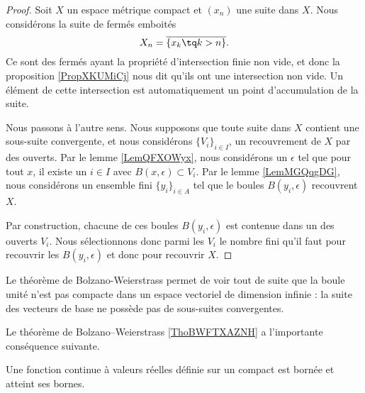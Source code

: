 \begin{proof}
   Soit \( X\) un espace métrique compact et \( (x_n)\) une suite dans \( X\). Nous considérons la suite de fermés emboités
   \begin{equation}
       X_n=\overline{ \{ x_k\tq k>n \} }.
   \end{equation}
   Ce sont des fermés ayant la propriété d'intersection finie non vide, et donc la proposition \ref{PropXKUMiCj} nous dit qu'ils ont une intersection non vide. Un élément de cette intersection est automatiquement un point d'accumulation de la suite.

   Nous passons à l'autre sens. Nous supposons que toute suite dans \( X\) contient une sous-suite convergente, et nous considérons \( \{ V_i \}_{i\in I}\), un recouvrement de \( X\) par des ouverts. Par le lemme \ref{LemQFXOWyx}, nous considérons un \( \epsilon\) tel que pour tout \( x\), il existe un \( i\in I\) avec \( B(x,\epsilon)\subset V_i\). Par le lemme \ref{LemMGQqgDG}, nous considérons un ensemble fini \( \{ y_i \}_{i\in A}\) tel que le boules \( B(y_i,\epsilon)\) recouvrent \( X\).

   Par construction, chacune de ces boules \( B(y_i,\epsilon)\) est contenue dans un des ouverts \( V_i\). Nous sélectionnons donc parmi les \( V_i\) le nombre fini qu'il faut pour recouvrir les \( B(y_i,\epsilon)\) et donc pour recouvrir \( X\).
\end{proof}

\begin{example}\label{ExEFYooTILPDk}
    Le théorème de Bolzano-Weierstrass permet de voir tout de suite que la boule unité n'est pas compacte dans un espace vectoriel de dimension infinie : la suite des vecteurs de base ne possède pas de sous-suites convergentes.
\end{example}

Le théorème de Bolzano–Weierstrass \ref{ThoBWFTXAZNH} a l'importante conséquence suivante.
\begin{theorem}[Weierstrass]		\label{ThoWeirstrassRn}
	Une fonction continue à valeurs réelles définie sur un compact est bornée et atteint ses bornes.
\end{theorem}

